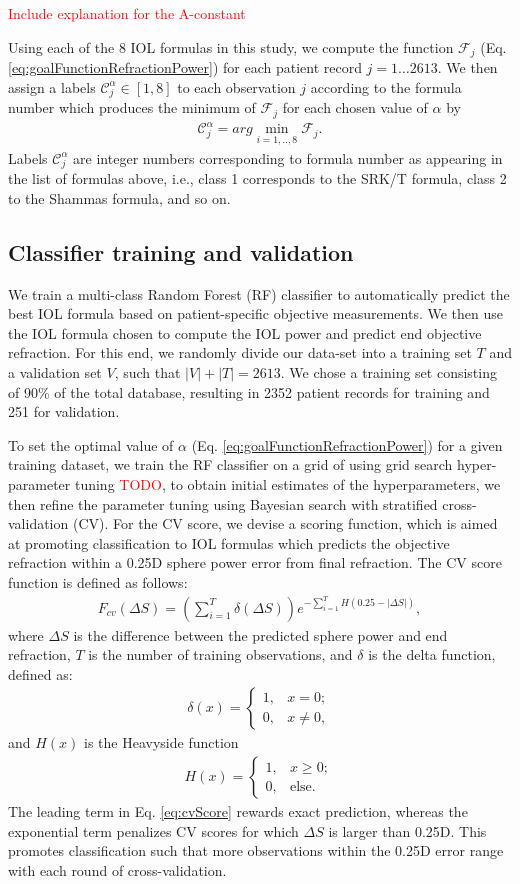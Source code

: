 \documentclass[article,twocolumn,preprint,10pt]{paper}%
\renewcommand{\(}{\left(}
\renewcommand{\)}{\right)}
\renewcommand{\[}{\left[}
\renewcommand{\]}{\right]}
\newcommand{\red}{\textcolor{red}}
\newcommand{\ds}{\displaystyle}
\newcommand{\beq}{\begin{eqnarray}}
\newcommand{\eeq}{\end{eqnarray}}
\newcommand{\beqq}{\begin{eqnarray*}}
\newcommand{\eeqq}{\end{eqnarray*}}
\newcommand{\1}{\mbox{\boldmath$1$}}
\begin{document}
\red{Include explanation for the A-constant}

Using each of the 8 IOL formulas in this study, we compute the function $\mathcal{F}_j$ (Eq. \ref{eq:goalFunctionRefractionPower}) for each patient record $j=1\ldots2613$. We then assign a labels $\mathcal{C}_j^\alpha\in[1,8]$ to each observation $j$ according to the formula number which produces the minimum of $\mathcal{F}_j$ for each chosen value of $\alpha$ by
\beq 
\mathcal{C}_j^\alpha = \ds arg\min_{i=1,..,8}\mathcal{F}_j.
\eeq 
Labels $\mathcal{C}_j^\alpha$ are integer numbers corresponding to formula number as appearing in the list of formulas above, i.e., class 1 corresponds to the SRK/T formula, class 2 to the Shammas formula, and so on. 


\subsection{Classifier training and validation}
We train a multi-class Random Forest (RF) classifier to automatically predict the best IOL formula based on patient-specific objective measurements. We then use the IOL formula chosen to compute the IOL power and predict end objective refraction. For this end, we randomly divide our data-set into a training set $T$ and a validation set $V$, such that $|V|+|T|=2613$. We chose a training set consisting of 90\% of the total database, resulting in 2352 patient records for training and 251 for validation.

To set the optimal value of $\alpha$ (Eq. \ref{eq:goalFunctionRefractionPower}) for a given training dataset, we train the RF classifier on a grid of using grid search hyper-parameter tuning \red{TODO}, to obtain initial estimates of the hyperparameters, we then refine the parameter tuning using Bayesian search with stratified cross-validation (CV). For the CV score, we devise a scoring function, which is aimed at promoting classification to IOL formulas which predicts the objective refraction within a 0.25D sphere power error from final refraction.
The CV score function is defined as follows: 
\beq\label{eq:cvScore}
F_{cv}(\Delta S) = \left(\sum_{i=1}^T\delta(\Delta S)\right)e^{-\ds\sum_{i=1}^T H(0.25-|\Delta S|)},
\eeq 
where $\Delta S$ is the difference between the predicted sphere power and end refraction, $T$ is the number of training observations,  and $\delta$ is the delta function, defined as:
\beqq
\delta(x) = \begin{cases}
	1, & x=0;\\
	0,& x\neq 0,
\end{cases}
\eeqq 
and $H(x)$ is the Heavyside function 
\beqq
H(x) = \begin{cases}
	1,& x\geq0;\\
	0,& \text{else}.
\end{cases}
\eeqq 
The leading term in Eq. \ref{eq:cvScore} rewards exact prediction, whereas the exponential term penalizes CV scores for which $\Delta S$ is larger than 0.25D. This promotes classification such that more observations within the 0.25D error range with each round of cross-validation. 
\end{document}
